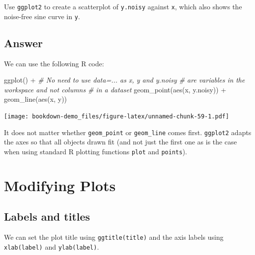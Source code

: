 \documentclass[
]{book}
\newenvironment{Shaded}{\begin{snugshade}}{\end{snugshade}}
\newcommand{\CommentTok}[1]{\textcolor[rgb]{0.56,0.35,0.01}{\textit{#1}}}
\newcommand{\FunctionTok}[1]{\textcolor[rgb]{0.00,0.00,0.00}{#1}}
\newcommand{\NormalTok}[1]{#1}
\newcommand{\SpecialCharTok}[1]{\textcolor[rgb]{0.00,0.00,0.00}{#1}}
\begin{document}
Use \texttt{ggplot2} to create a scatterplot of \texttt{y.noisy} against \texttt{x}, which also shows the noise-free sine curve in \texttt{y}.

\hypertarget{answer-6}{%
\subsection{Answer}\label{answer-6}}

We can use the following R code:

\begin{Shaded}
\begin{Highlighting}[]
\FunctionTok{ggplot}\NormalTok{() }\SpecialCharTok{+}                               \CommentTok{\# No need to use data=... as x, y and y.noisy}
                                         \CommentTok{\# are variables in the workspace and not columns}
                                         \CommentTok{\# in a dataset}
    \FunctionTok{geom\_point}\NormalTok{(}\FunctionTok{aes}\NormalTok{(x, y.noisy)) }\SpecialCharTok{+}
    \FunctionTok{geom\_line}\NormalTok{(}\FunctionTok{aes}\NormalTok{(x, y))}
\end{Highlighting}
\end{Shaded}

\texttt{[image: bookdown-demo\_files/figure-latex/unnamed-chunk-59-1.pdf]}

It does not matter whether \texttt{geom\_point} or \texttt{geom\_line} comes first. \texttt{ggplot2} adapts the axes so that all objects drawn fit (and not just the first one as is the case when using standard R plotting functions \texttt{plot} and \texttt{points}).

\hypertarget{modifying-plots}{%
\section{Modifying Plots}\label{modifying-plots}}

\hypertarget{labels-and-titles}{%
\subsection{Labels and titles}\label{labels-and-titles}}

We can set the plot title using \texttt{ggtitle(title)} and the axis labels using \texttt{xlab(label)} and \texttt{ylab(label)}.
\end{document}
